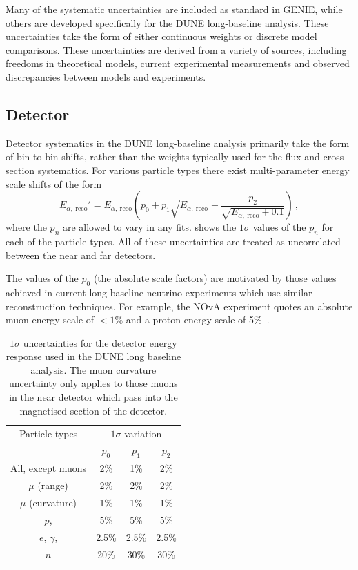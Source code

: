 Many of the systematic uncertainties are included as standard in GENIE, while others are developed specifically for the DUNE long-baseline analysis.
These uncertainties take the form of either continuous weights or discrete model comparisons.
These uncertainties are derived from a variety of sources, including freedoms in theoretical models, current experimental measurements and observed discrepancies between models and experiments.

\subsection{Detector}
\label{sec:dune_lbl:systs:det}

Detector systematics in the DUNE long-baseline analysis primarily take the form of bin-to-bin shifts, rather than the weights typically used for the flux and cross-section systematics.
For various particle types there exist multi-parameter energy scale shifts of the form
\begin{equation}
E_{\alpha,~\text{reco}}' = E_{\alpha,~\text{reco}} \left( p_{0} + p_{1} \sqrt{E_{\alpha,~\text{reco}}} + \frac{p_{2}}{\sqrt{E_{\alpha,~\text{reco}}+0.1}} \right) \, ,
\label{eq:energyResponse}	
\end{equation}
where the $p_{n}$ are allowed to vary in any fits.
 shows the $1\sigma$ values of the $p_{n}$ for each of the particle types.
All of these uncertainties are treated as uncorrelated between the near and far detectors.

The values of the $p_{0}$ (the absolute scale factors) are motivated by those values achieved in current long baseline neutrino experiments which use similar reconstruction techniques.
For example, the NOvA experiment quotes an absolute muon energy scale of $<1\%$ and a proton energy scale of 5\%~\cite{nova2018}.

\begin{table}
	\caption[$1\sigma$ uncertainties for the detector energy response used in the DUNE long baseline analysis]{$1\sigma$ uncertainties for the detector energy response used in the DUNE long baseline analysis. The muon curvature uncertainty only applies to those muons in the near detector which pass into the magnetised section of the detector.}
	\label{tab:energyScaleParams}
	\centering
	\begin{tabular}{c c c c}
		\hline
		\hline
		Particle types & \multicolumn{3}{c}{$1\sigma$ variation} \\
		& $p_{0}$ & $p_{1}$ & $p_{2}$ \\
		\hline
		All, except muons      & 2\%   & 1\%   & 2\%   \\
		$\mu$ (range)          & 2\%   & 2\%   & 2\%   \\
		$\mu$ (curvature)      & 1\%   & 1\%   & 1\%   \\
		$p$, \pipm             & 5\%   & 5\%   & 5\%   \\
		$e$, $\gamma$, \pizero & 2.5\% & 2.5\% & 2.5\% \\
		$n$                    & 20\%  & 30\%  & 30\% \\
		\hline
	\end{tabular}
\end{table}

